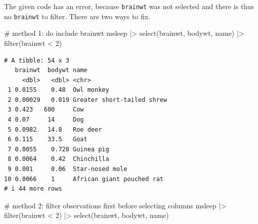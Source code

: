 \documentclass[
  letterpaper,
  DIV=11,
  numbers=noendperiod]{scrreprt}
\newenvironment{Shaded}{\begin{snugshade}}{\end{snugshade}}
\newcommand{\CommentTok}[1]{\textcolor[rgb]{0.37,0.37,0.37}{#1}}
\newcommand{\DecValTok}[1]{\textcolor[rgb]{0.68,0.00,0.00}{#1}}
\newcommand{\FunctionTok}[1]{\textcolor[rgb]{0.28,0.35,0.67}{#1}}
\newcommand{\NormalTok}[1]{\textcolor[rgb]{0.00,0.23,0.31}{#1}}
\newcommand{\SpecialCharTok}[1]{\textcolor[rgb]{0.37,0.37,0.37}{#1}}
\begin{document}
\begin{tcolorbox}[enhanced jigsaw, colbacktitle=quarto-callout-tip-color!10!white, opacitybacktitle=0.6, breakable, left=2mm, leftrule=.75mm, toprule=.15mm, toptitle=1mm, bottomtitle=1mm, colframe=quarto-callout-tip-color-frame, opacityback=0, coltitle=black, arc=.35mm, titlerule=0mm, colback=white, bottomrule=.15mm, title=\textcolor{quarto-callout-tip-color}{\faLightbulb}\hspace{0.5em}{Answer}, rightrule=.15mm]

The given code has an error, because \texttt{brainwt} was not selected
and there is thus no \texttt{brainwt} to filter. There are two ways to
fix.

\begin{Shaded}
\begin{Highlighting}[]
\CommentTok{\# method 1: do include brainwt}
\NormalTok{msleep }\SpecialCharTok{|\textgreater{}}
  \FunctionTok{select}\NormalTok{(brainwt, bodywt, name) }\SpecialCharTok{|\textgreater{}}
  \FunctionTok{filter}\NormalTok{(brainwt }\SpecialCharTok{\textless{}} \DecValTok{2}\NormalTok{) }
\end{Highlighting}
\end{Shaded}

\begin{verbatim}
# A tibble: 54 x 3
   brainwt  bodywt name                      
     <dbl>   <dbl> <chr>                     
 1 0.0155    0.48  Owl monkey                
 2 0.00029   0.019 Greater short-tailed shrew
 3 0.423   600     Cow                       
 4 0.07     14     Dog                       
 5 0.0982   14.8   Roe deer                  
 6 0.115    33.5   Goat                      
 7 0.0055    0.728 Guinea pig                
 8 0.0064    0.42  Chinchilla                
 9 0.001     0.06  Star-nosed mole           
10 0.0066    1     African giant pouched rat 
# i 44 more rows
\end{verbatim}

\begin{Shaded}
\begin{Highlighting}[]
\CommentTok{\# method 2: filter observations first before selecting columns}
\NormalTok{msleep }\SpecialCharTok{|\textgreater{}}
  \FunctionTok{filter}\NormalTok{(brainwt }\SpecialCharTok{\textless{}} \DecValTok{2}\NormalTok{) }\SpecialCharTok{|\textgreater{}}
  \FunctionTok{select}\NormalTok{(brainwt, bodywt, name)}
\end{Highlighting}
\end{Shaded}


\end{tcolorbox}
\end{document}
